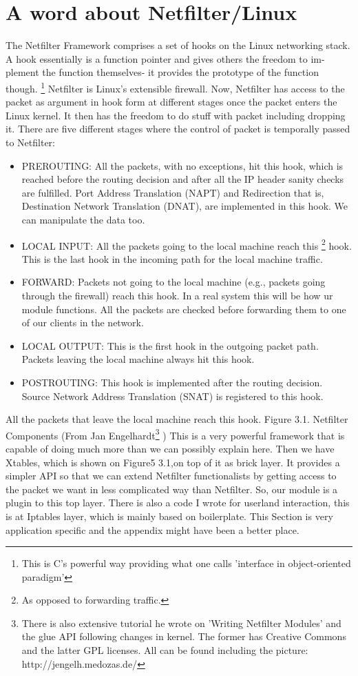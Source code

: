 \documentclass[11pt,left=2cm,bottom=2cm,oneside]{book}
\begin{document}
\section{A word about Netfilter/Linux}
The Netfilter Framework comprises a set of hooks on the Linux networking
stack. A hook essentially is a function pointer and gives others the freedom to im-
plement the function themselves- it provides the prototype of the function though.
\footnote{This is C's powerful way providing what one calls 'interface in object-oriented paradigm'}
Netfilter is Linux's extensible firewall. Now, Netfilter has access to the packet as
argument in hook form at different stages once the packet enters the Linux kernel.
It then has the freedom to do stuff with packet including dropping it. There are
five different stages where the control of packet is temporally passed to Netfilter:
\begin{itemize}
\item PREROUTING: All the packets, with no exceptions, hit this hook, which
is reached before the routing decision and after all the IP header sanity
checks are fulfilled. Port Address Translation (NAPT) and Redirection
that is, Destination Network Translation (DNAT), are implemented in
this hook. We can manipulate the data too.
\item LOCAL INPUT: All the packets going to the local machine reach this
\footnote{As opposed to forwarding traffic.}
hook. This is the last hook in the incoming path for the local machine
traffic.
\item FORWARD: Packets not going to the local machine (e.g., packets going
through the firewall) reach this hook. In a real system this will be how
ur module functions. All the packets are checked before forwarding them
to one of our clients in the network.
\item LOCAL OUTPUT: This is the first hook in the outgoing packet path.
Packets leaving the local machine always hit this hook.
\item POSTROUTING: This hook is implemented after the routing decision.
Source Network Address Translation (SNAT) is registered to this hook.
\end{itemize}
All the packets that leave the local machine reach this hook.
Figure 3.1. Netfilter Components (From Jan Engelhardt\footnote{There is also extensive tutorial he wrote on 'Writing Netfilter Modules'
and the glue API following changes in kernel. The former has Creative Commons and the latter
GPL licenses. All can be found including the picture: http://jengelh.medozas.de/}
)
This is a very powerful framework that is capable of doing much more than
we can possibly explain here. Then we have Xtables, which is shown on Figure5
3.1,on top of it as brick layer. It provides a simpler API so that we can extend
Netfilter functionalists by getting access to the packet we want in less complicated
way than Netfilter. So, our module is a plugin to this top layer. There is also a code
I wrote for userland interaction, this is at Iptables layer, which is mainly based on
boilerplate. This Section is very application specific and the appendix might have
been a better place.
\end{document}
